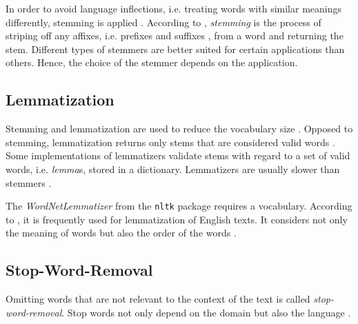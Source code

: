In order to avoid language inflections, i.e. treating words with similar meanings differently, stemming is applied \cite{clusteringDocs2020}.
According to \citeauthor{nlp-book2009}, \textit{stemming} is the process of striping off any affixes, i.e. prefixes and suffixes \cite{IR2011}, 
from a word and returning the stem.
Different types of stemmers are better suited for certain applications than others.
Hence, the choice of the stemmer depends on the application.


\subsection{Lemmatization}\label{subsec:lemmatization}

Stemming and lemmatization are used to reduce the vocabulary size \cite{clusteringDocs2020}.
Opposed to stemming, lemmatization returns only stems that are considered valid words \cite{nlp-book2009}.
Some implementations of lemmatizers validate stems with regard to a set of valid words, i.e. \textit{lemma}s, stored in a dictionary.
Lemmatizers are usually slower than stemmers \cite{nlp-book2009}.

The \textit{WordNetLemmatizer} from the \texttt{nltk} package requires a vocabulary. %
According to \citeauthor{clusteringDocs2020}, it is frequently used for lemmatization of English texts.
It considers not only the meaning of words but also the order of the words \cite{clusteringDocs2020}.


\subsection{Stop-Word-Removal}\label{subsec:stop-word-removal}

Omitting words that are not relevant to the context of the text is called \textit{stop-word-removal}.
Stop words not only depend on the domain but also the language \cite{IR2011}.



